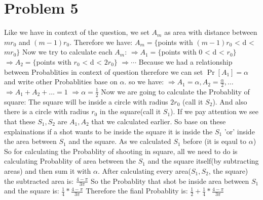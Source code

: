\documentclass[12pt]{article}
\begin{document}
\section*{Problem 5}
Like we have in context of the question, we set $A_{m}$
as area with distance between $mr_{0}$ and $(m-1)r_{0}$.
\newline Therefore we have:
\newline $A_{m} = \{$points with $(m-1)r_{0}$ < d < $mr_{0}$$\}$
        \newline Now we try to calculate each $A_{m}$:
        \newline \newline $\Rightarrow A_{1} = \{$points with 0 < d < $r_{0}$$\}$
    \newline $\Rightarrow A_{2} = \{$points with $r_{0}$ < d < $2r_{0}$$\}$
    \newline $\Rightarrow\cdots$
    \newline \newline Because we had a relationship between Probablities in context of question
    therefore we can set $\Pr[A_{1}] = \alpha$ and write other Probablities base on $\alpha$.
    \newline so we have:
    \newline \newline $\Rightarrow A_{1}=\alpha, A_{2}= \frac{\alpha}{2}, \ldots$
    \newline $\Rightarrow A_{1} + A_{2} + \ldots = 1 $
    \newline $\Rightarrow \alpha = \frac{1}{2}$
    \newline \newline Now we are going to calculate the Probablity of square:
    \newline The square will be inside a circle with radius $2r_{0}$ (call it $S_{2}$).
    \newline And also there is a circle with radius $r_{0}$ in the square(call it $S_{1}$).
    \newline If we pay attention we see that these $S_{1} , S_{2}$ are $A_{1} , A_{2}$ that we calculated earlier.
    \newline So base on these explainations if a shot wants to be inside the square
    it is inside the $S_{1}$ 'or' inside the area between $S_{1}$ and the square.
    \newline As we calculated $S_{1}$ before (it is eqaul to $\alpha$)
    So for calculating the Probablity of shooting in square, all we need to do is
    calculating Probablity of area between the $S_{1}$ and the square itself(by subtracting areas) and then sum it with $\alpha$.
    \newline After calculating every area($S_{1}, S_{2}$, the square) the subtracted area is: $\frac{4-\pi}{3\pi}$
    \newline So the Probablity that shot be inside area between $S_{1}$ and the square is: $ \frac{1}{4} * \frac{4-\pi}{3\pi}$
    \newline \newline Therefore the fianl Probablity is: $ \frac{1}{2} + \frac{1}{4} * \frac{4-\pi}{3\pi} $
\end{document}

